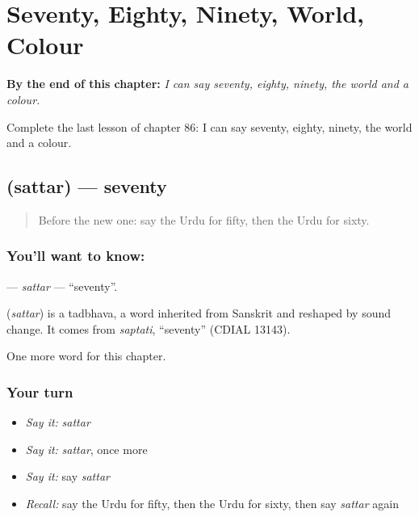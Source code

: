 
\chapter{Seventy, Eighty, Ninety, World, Colour}
\label{ch:ur-seventy-eighty-ninety-world-colour}

\begin{chapteropening}
\textbf{By the end of this chapter:} \emph{I can say seventy, eighty, ninety, the world and a colour.}

Complete the last lesson of chapter 86: I can say seventy, eighty, ninety, the world and a colour.
\end{chapteropening}

\section[\texorpdfstring{\ur{ستر} (sattar)}{ستر (sattar)}]{ (sattar) — seventy}

\label{lesson:UR-C86-sattar}



\begin{quote}
Before the new one: say the Urdu for fifty, then the Urdu for sixty.
\end{quote}

\subsection*{You'll want to know: }
\textbf{} — \emph{sattar} — \textquotedblleft{}seventy\textquotedblright{}.

\begin{cousinweb}
\textbf{} (\emph{sattar}) is a tadbhava, a word inherited from Sanskrit and reshaped by sound change. It comes from \emph{saptati}, \textquotedblleft{}seventy\textquotedblright{} (CDIAL 13143).
\end{cousinweb}

\begin{grammarlens}[title={What you've built}]
One more word for this chapter.
\end{grammarlens}

\subsection*{Your turn}
\begin{itemize}
\raggedright
  \item \emph{Say it:} \emph{sattar}
  \item \emph{Say it:} \emph{sattar}, once more
  \item \emph{Say it:} say \emph{sattar}
  \item \emph{Recall:} say the Urdu for fifty, then the Urdu for sixty, then say \emph{sattar} again
\end{itemize}

